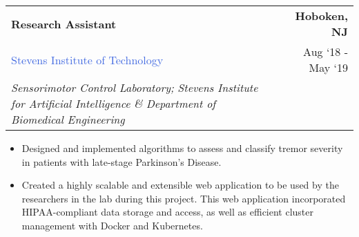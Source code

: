 \documentclass[10pt]{article}
\newcommand{\highlightcolor}{RoyalBlue}
\newcommand{\tabularxwidth}{\textwidth}
\begin{document}
    \begin{minipage}{\tabularxwidth}

        \begin{tabularx}{\tabularxwidth}{X r}
            \textbf{Research Assistant} & \textbf{Hoboken, 
        NJ} \\
            
    
    
    
    

    
        \textcolor{\highlightcolor}{Stevens Institute of Technology} & 
        
    Aug ‘18 - 
    May ‘19 \\
        
            \textit{Sensorimotor Control Laboratory;}
                \textit{Stevens Institute for Artificial Intelligence} \textit{\&}
                \textit{Department of Biomedical Engineering} & \\
        
    
            
        \end{tabularx}

        \begin{itemize}[noitemsep, topsep=3pt, parsep=0pt, partopsep=0pt]
            
                \item 
    Designed and implemented algorithms to assess and classify tremor severity in patients with late-stage Parkinson's Disease.
            
                \item 
    Created a highly scalable and extensible web application to be used by the researchers in the lab during this project. This web application incorporated HIPAA-compliant data storage and access, as well as efficient cluster management with Docker and Kubernetes.
            
        \end{itemize}

        
            \vspace{.3em}
        

    \end{minipage}
    
\end{document}
